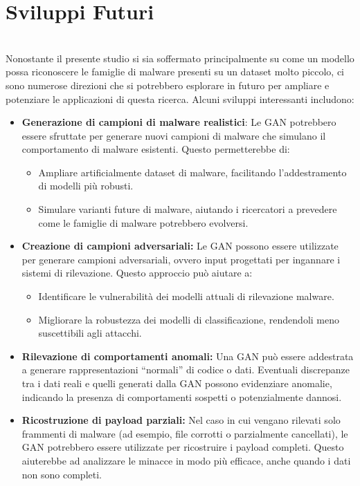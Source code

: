 \section{Sviluppi Futuri}
~\\
\indent Nonostante il presente studio si sia soffermato principalmente su come un modello possa riconoscere le famiglie di malware presenti su un dataset molto piccolo, ci sono numerose direzioni che si potrebbero esplorare in futuro per ampliare e potenziare le applicazioni di questa ricerca. Alcuni sviluppi interessanti includono:
\begin{itemize}
    \item \textbf{Generazione di campioni di malware realistici}: Le GAN potrebbero essere sfruttate per generare nuovi campioni di malware che simulano il comportamento di malware esistenti. Questo permetterebbe di:
    \begin{itemize}
        \item Ampliare artificialmente dataset di malware, facilitando l'addestramento di modelli più robusti.
        \item Simulare varianti future di malware, aiutando i ricercatori a prevedere come le famiglie di malware potrebbero evolversi.
    \end{itemize}

    \item \textbf{Creazione di campioni adversariali:} Le GAN possono essere utilizzate per generare campioni adversariali, ovvero input progettati per ingannare i sistemi di rilevazione. Questo approccio può aiutare a:
    \begin{itemize}
        \item Identificare le vulnerabilità dei modelli attuali di rilevazione malware.
        \item Migliorare la robustezza dei modelli di classificazione, rendendoli meno suscettibili agli attacchi.
    \end{itemize}

    \item \textbf{Rilevazione di comportamenti anomali:} Una GAN può essere addestrata a generare rappresentazioni ``normali'' di codice o dati. Eventuali discrepanze tra i dati reali e quelli generati dalla GAN possono evidenziare anomalie, indicando la presenza di comportamenti sospetti o potenzialmente dannosi.

    \item \textbf{Ricostruzione di payload parziali:} Nel caso in cui vengano rilevati solo frammenti di malware (ad esempio, file corrotti o parzialmente cancellati), le GAN potrebbero essere utilizzate per ricostruire i payload completi. Questo aiuterebbe ad analizzare le minacce in modo più efficace, anche quando i dati non sono completi.


\end{itemize}
